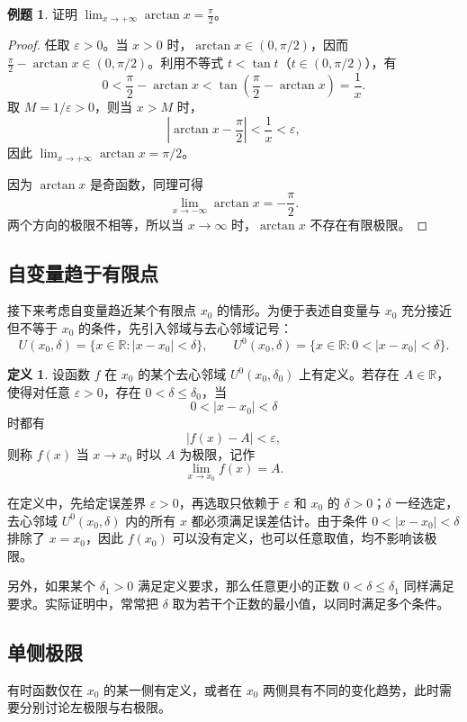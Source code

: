 \documentclass[UTF8,fontset=fandol,a4paper,12pt]{ctexart}
\newcommand{\R}{\mathbb R}
\newcommand{\U}{U}
\theoremstyle{definition}
\newtheorem*{definition}{定义}
\newtheorem*{example}{例题}
\begin{document}
\begin{example}
证明 $\displaystyle\lim_{x\to+\infty}\arctan x=\frac\pi2$。
\end{example}
\begin{proof}
任取 $\varepsilon>0$。当 $x>0$ 时，$\arctan x\in(0,\pi/2)$，因而 $\frac\pi2-\arctan x\in(0,\pi/2)$。利用不等式 $t<\tan t$（$t\in(0,\pi/2)$），有
\[
 0<\frac\pi2-\arctan x<\tan\left(\frac\pi2-\arctan x\right)=\frac1x.
\]
取 $M=1/\varepsilon>0$，则当 $x>M$ 时，
\[
 \left|\arctan x-\frac\pi2\right|<\frac1x<\varepsilon,
\]
因此 $\displaystyle\lim_{x\to+\infty}\arctan x=\pi/2$。

因为 $\arctan x$ 是奇函数，同理可得
\[
 \lim_{x\to-\infty}\arctan x=-\frac\pi2.
\]
两个方向的极限不相等，所以当 $x\to\infty$ 时，$\arctan x$ 不存在有限极限。
\end{proof}

\subsection*{自变量趋于有限点}
接下来考虑自变量趋近某个有限点 $x_0$ 的情形。为便于表述自变量与 $x_0$ 充分接近但不等于 $x_0$ 的条件，先引入邻域与去心邻域记号：
\[
 \U(x_0,\delta)=\{x\in\R:|x-x_0|<\delta\},\qquad
 \U^0(x_0,\delta)=\{x\in\R:0<|x-x_0|<\delta\}.
\]

\begin{definition}
设函数 $f$ 在 $x_0$ 的某个去心邻域 $\U^0(x_0,\delta_0)$ 上有定义。若存在 $A\in\R$，使得对任意 $\varepsilon>0$，存在 $0<\delta\le\delta_0$，当
\[
 0<|x-x_0|<\delta
\]
时都有
\[
 |f(x)-A|<\varepsilon,
\]
则称 $f(x)$ 当 $x\to x_0$ 时以 $A$ 为极限，记作
\[
 \lim_{x\to x_0}f(x)=A.
\]
\end{definition}

在定义中，先给定误差界 $\varepsilon>0$，再选取只依赖于 $\varepsilon$ 和 $x_0$ 的 $\delta>0$；$\delta$ 一经选定，去心邻域 $\U^0(x_0,\delta)$ 内的所有 $x$ 都必须满足误差估计。由于条件 $0<|x-x_0|<\delta$ 排除了 $x=x_0$，因此 $f(x_0)$ 可以没有定义，也可以任意取值，均不影响该极限。

另外，如果某个 $\delta_1>0$ 满足定义要求，那么任意更小的正数 $0<\delta\le\delta_1$ 同样满足要求。实际证明中，常常把 $\delta$ 取为若干个正数的最小值，以同时满足多个条件。

\subsection*{单侧极限}
有时函数仅在 $x_0$ 的某一侧有定义，或者在 $x_0$ 两侧具有不同的变化趋势，此时需要分别讨论左极限与右极限。
\end{document}
